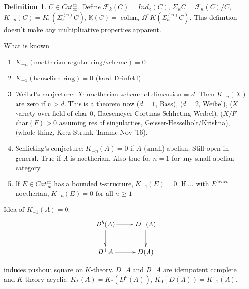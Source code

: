 \documentclass[letterpaper]{article}
\theoremstyle{definition}
\newtheorem{definition}[lemma]{Definition}
\newcommand{\mbb}{\mathbb}
\newcommand{\mc}{\mathcal}
\DeclareMathOperator*{\colim}{colim}
\begin{document}
\begin{definition}
$C \in Cat_{\infty}^{ex}$. Define $\mc F_k(C) = Ind_\kappa(C)$,
$\Sigma_\kappa C = \mc F_\kappa (C)/C$, $K_{-n}(C) =
K_0(\Sigma_\kappa^{(n)} C)$, $\mbb K(C) = \colim_n \Omega^n
K(\Sigma^{(n)}_\kappa C)$. This definition doesn't make any
multiplicative properties apparent. 
\end{definition}

What is known:

\begin{enumerate}
\item $K_{-n}(\text{noetherian regular ring/scheme}) = 0$
\item $K_{-1}(\text{henselian ring}) = 0$ (hard-Drinfeld)
\item Weibel's conjecture: $X$: noetherian scheme of dimension =
  $d$. Then $K_{-n}(X)$ are zero if $n > d$. This is a theorem now ($d
  = 1$, Bass), ($d = 2$, Weibel), ($X$ variety over field of char 0,
  Haesemeyer-Cortinas-Schlicting-Weibel), ($X/F$ char$(F) > 0$
  assuming res of singularites, Geisser-Hesselholt/Krishna), (whole
  thing, Kerz-Strunk-Tamme Nov '16).
\item Schlicting's conjecture: $K_{-n}(A) = 0$ if $A$ (small)
  abelian. Still open in general. True if $A$ is noetherian. Also true
  for $n = 1$ for any small abelian category. 
\item If $E \in Cat_\infty^{ex}$ has a bounded $t$-structure,
  $K_{-1}(E) = 0$. If ... with $E^{heart}$ noetherian, $K_{-n}(E) =
  0$ for all $n \geq 1$. 
\end{enumerate}

Idea of $K_{-1}(A) = 0$. 
\[
\xymatrix{D^b(A) \ar[r]\ar[d] & D^{-}(A) \ar[d] \\ D^+A \ar[r] & D(A)}
\]

induces pushout square on $K$-theory. $D^+A$ and $D^{-}A$ are
idempotent complete and $K$-theory acyclic. $K_*(A) = K_*(D^b(A))$,
$K_0(D(A)) = K_{-1}(A)$. 
\end{document}
